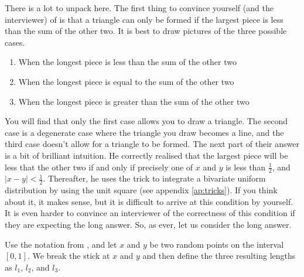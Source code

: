 \documentclass[a4paper]{article}
\begin{document}
There is a lot to unpack here.
The first thing to convince yourself (and the interviewer) of is that a triangle can only be formed if the largest piece is less than the sum of the other two.
It is best to draw pictures of the three possible cases.
\begin{enumerate}
  \item When the longest piece is less than the sum of the other two
  \item When the longest piece is equal to the sum of the other two
  \item When the longest piece is greater than the sum of the other two
\end{enumerate}
You will find that only the first case allows you to draw a triangle.
The second case is a degenerate case where the triangle you draw becomes a line, and the third case doesn't allow for a triangle to be formed.
The next part of their answer is a bit of brilliant intuition.
He correctly realised that the largest piece will be less that the other two if and only if precisely one of $x$ and $y$ is less than $\frac{1}{2}$, and $|x-y|<\frac{1}{2}$.
Thereafter, he uses the trick to integrate a bivariate uniform distribution by using the unit square (see appendix \ref{ap:tricks}).
If you think about it, it makes sense, but it is difficult to arrive at this condition by yourself.
It is even harder to convince an interviewer of the correctness of this condition if they are expecting the long answer.
So, as ever, let us consider the long answer.

Use the notation from \citet{JoshiQA}, and let $x$ and $y$ be two random points on the interval $[0,1]$.
We break the stick at $x$ and $y$ and then define the three resulting lengths as
$l_1$,
$l_2$, and
$l_3$.
\end{document}
